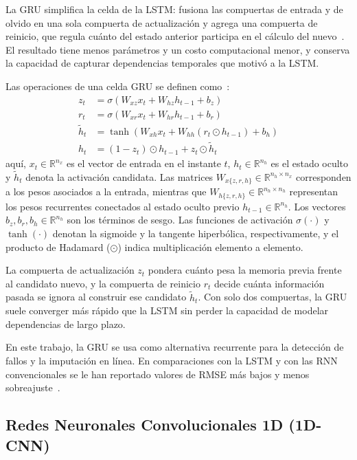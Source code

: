 \documentclass{report}
\begin{document}
La GRU simplifica la celda de la LSTM: fusiona las compuertas de entrada y de olvido en una sola compuerta de actualización y agrega una compuerta de reinicio, que regula cuánto del estado anterior participa en el cálculo del nuevo~\cite{dey2017gate}. El resultado tiene menos parámetros y un costo computacional menor, y conserva la capacidad de capturar dependencias temporales que motivó a la LSTM.

Las operaciones de una celda GRU se definen como~\cite{dey2017gate}:
\begin{equation}
\label{eq:gru}
\begin{aligned}
z_t &= \sigma(W_{xz} x_t + W_{hz} h_{t-1} + b_z) \\
r_t &= \sigma(W_{xr} x_t + W_{hr} h_{t-1} + b_r) \\
\tilde{h}_t &= \tanh(W_{xh} x_t + W_{hh} (r_t \odot h_{t-1}) + b_h) \\
h_t &= (1 - z_t) \odot h_{t-1} + z_t \odot \tilde{h}_t
\end{aligned}
\end{equation}
aquí, $x_t \in \mathbb{R}^{n_x}$ es el vector de entrada en el instante $t$, $h_t \in \mathbb{R}^{n_h}$ es el estado oculto y $\tilde{h}_t$ denota la activación candidata. Las matrices $W_{x\{z,r,h\}} \in \mathbb{R}^{n_h \times n_x}$ corresponden a los pesos asociados a la entrada, mientras que $W_{h\{z,r,h\}} \in \mathbb{R}^{n_h \times n_h}$ representan los pesos recurrentes conectados al estado oculto previo $h_{t-1} \in \mathbb{R}^{n_h}$. Los vectores $b_z, b_r, b_h \in \mathbb{R}^{n_h}$ son los términos de sesgo. Las funciones de activación $\sigma(\cdot)$ y $\tanh(\cdot)$ denotan la sigmoide y la tangente hiperbólica, respectivamente, y el producto de Hadamard ($\odot$) indica multiplicación elemento a elemento.

La compuerta de actualización $z_t$ pondera cuánto pesa la memoria previa frente al candidato nuevo, y la compuerta de reinicio $r_t$ decide cuánta información pasada se ignora al construir ese candidato $\tilde{h}_t$. Con solo dos compuertas, la GRU suele converger más rápido que la LSTM sin perder la capacidad de modelar dependencias de largo plazo.

En este trabajo, la GRU se usa como alternativa recurrente para la detección de fallos y la imputación en línea. En comparaciones con la LSTM y con las RNN convencionales se le han reportado valores de RMSE más bajos y menos sobreajuste~\cite{siami2019performance,alshehri2024blood}.

\subsection{Redes Neuronales Convolucionales 1D (1D-CNN)}
\label{subsec:1dcnn}
\end{document}

